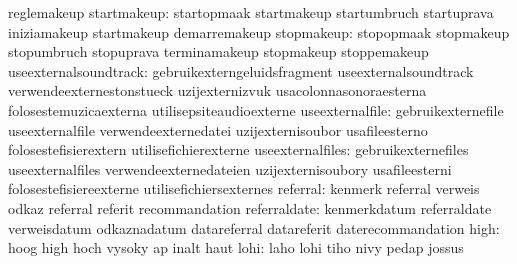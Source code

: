                                  reglemakeup
                     startmakeup: startopmaak                      startmakeup
                                  startumbruch                     startuprava
                                  iniziamakeup                     startmakeup
                                  demarremakeup
                      stopmakeup: stopopmaak                       stopmakeup
                                  stopumbruch                      stopuprava
                                  terminamakeup                    stopmakeup
                                  stoppemakeup
           useexternalsoundtrack: gebruikexterngeluidsfragment     useexternalsoundtrack
                                  verwendeexternestonstueck        uzijexternizvuk
                                  usacolonnasonoraesterna          folosestemuzicaexterna
                                  utilisepsiteaudioexterne
                 useexternalfile: gebruikexternefile               useexternalfile
                                  verwendeexternedatei             uzijexternisoubor
                                  usafileesterno                   folosestefisierextern
                                  utilisefichierexterne
                useexternalfiles: gebruikexternefiles              useexternalfiles
                                  verwendeexternedateien           uzijexternisoubory
                                  usafileesterni                   folosestefisiereexterne
                                  utilisefichiersexternes
                        referral: kenmerk                          referral
                                  verweis                          odkaz
                                  referral                         referit
                                  recommandation
                    referraldate: kenmerkdatum                     referraldate
                                  verweisdatum                     odkaznadatum
                                  datareferral                     datareferit
                                  daterecommandation
                            high: hoog                             high
                                  hoch                             vysoky
                                  ap                               inalt
                                  haut
                            lohi: laho                             lohi
                                  tiho                             nivy
                                  pedap                            jossus
